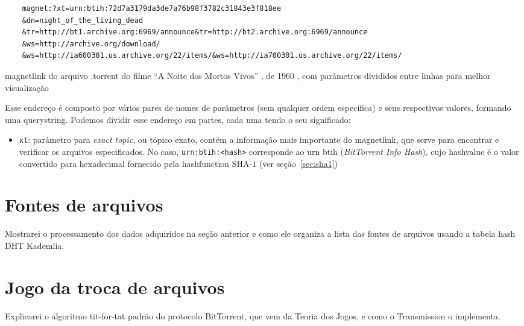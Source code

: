 \begin{listing}[ht!]
    \begin{verbatim}
    magnet:?xt=urn:btih:72d7a3179da3de7a76b98f3782c31843e3f818ee
    &dn=night_of_the_living_dead
    &tr=http://bt1.archive.org:6969/announce&tr=http://bt2.archive.org:6969/announce
    &ws=http://archive.org/download/
    &ws=http://ia600301.us.archive.org/22/items/&ws=http://ia700301.us.archive.org/22/items/
    \end{verbatim}
    \caption{\gls*{magnetlink} do arquivo .torrent do filme ``A Noite dos Mortos Vivos''
    , de 1960 \cite{torrent-file}, com parâmetros divididos entre linhas para melhor
    visualização}
    \label{lst:torrent-file-magnet-link}
\end{listing}

Esse endereço é composto por vários pares de nomes de parâmetros (sem qualquer ordem
específica) e seus respectivos valores, formando uma \gls{querystring}. Podemos
dividir esse endereço em partes, cada uma tendo o seu significado:

\begin{itemize}
    \item \verb|xt|: parâmetro para \emph{exact topic}, ou tópico exato, contém a
    informação mais importante do \gls*{magnetlink}, que serve para encontrar e
    verificar os arquivos especificados. No caso, \verb|urn:btih:<hash>| corresponde ao
    \gls{urn} btih (\emph{BitTorrent Info Hash}), cujo \gls{hashvalue} é o valor
    convertido para hexadecimal fornecido pela \gls{hashfunction} SHA-1 (ver
    seção~\ref{sec:sha1})
\end{itemize}


\section{Fontes de arquivos}

Mostrarei o processamento dos dados adquiridos na seção anterior e como ele organiza a lista das fontes de arquivos usando a tabela hash DHT Kademlia.

\section{Jogo da troca de arquivos}

Explicarei o algoritmo tit-for-tat padrão do protocolo BitTorrent, que vem da Teoria dos Jogos, e como o Transmission o implementa.

\afterpage{\clearpage}
